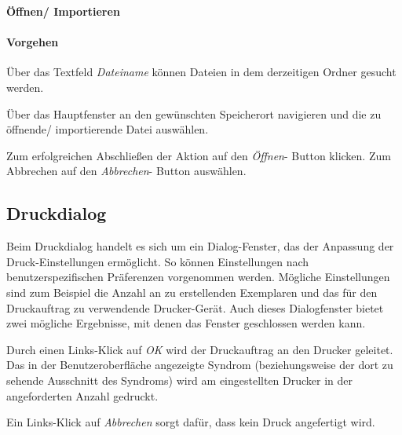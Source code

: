\documentclass[enabledeprecatedfontcommands,fontsize=11pt,paper=a4,twoside]{scrartcl}
\newcounter{one}
\newcounter{two}[one]
\newcommand*{\action}{\paragraph{Vorgehen}}
\let\tempone\itemize
\let\temptwo\enditemize
\renewenvironment{itemize}{\tempone\addtolength{\itemsep}{-10.0pt}}{\temptwo}
\let\origenumerate\enumerate
\let\origendenumerate\endenumerate
\renewenvironment{enumerate}{\origenumerate \addtolength{\itemsep}{-10.0pt}}{\origendenumerate}
\begin{document}
\textbf{Öffnen/ Importieren}
\action
\begin{enumerate}
	\item Über das Textfeld \textit{Dateiname} können Dateien in dem derzeitigen Ordner gesucht werden.
	\item Über das Hauptfenster an den gewünschten Speicherort navigieren und die zu öffnende/ importierende Datei auswählen.
	\item Zum erfolgreichen Abschließen der Aktion auf den \textit{Öffnen}- Button klicken. Zum Abbrechen auf den \textit{Abbrechen}- Button auswählen.
\end{enumerate}

 \begin{figure}[ht!]
 	\centering
 \end{figure}

\newpage
\subsection{Druckdialog}
Beim Druckdialog handelt es sich um ein Dialog-Fenster, das der Anpassung der Druck-Einstellungen ermöglicht. So können Einstellungen nach benutzerspezifischen Präferenzen vorgenommen werden. Mögliche Einstellungen sind zum Beispiel die Anzahl an zu erstellenden Exemplaren und das für den Druckauftrag zu verwendende Drucker-Gerät.
Auch dieses Dialogfenster bietet zwei mögliche Ergebnisse, mit denen das Fenster geschlossen werden kann.
\begin{itemize}
	\item Durch einen Links-Klick auf \textit{OK} wird der Druckauftrag an den Drucker geleitet. Das in der Benutzeroberfläche angezeigte Syndrom (beziehungsweise der dort zu sehende Ausschnitt des Syndroms) wird am eingestellten Drucker in der angeforderten Anzahl gedruckt. 
	\item Ein Links-Klick auf \textit{Abbrechen} sorgt dafür, dass kein Druck angefertigt wird.
\end{itemize}
\end{document}
